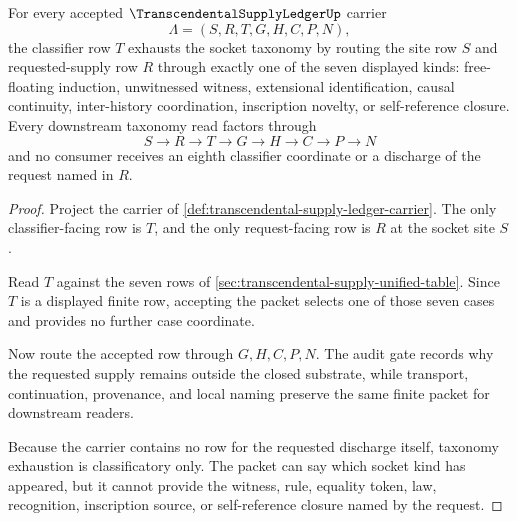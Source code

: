 \begin{theorem}
\label{thm:transcendental-supply-taxonomy-exhaustion}
For every accepted $\TranscendentalSupplyLedgerUp$ carrier
$$
\Lambda=(S,R,T,G,H,C,P,N),
$$
the classifier row $T$ exhausts the socket taxonomy by routing the site row $S$ and requested-supply row $R$ through exactly one of the seven displayed kinds: free-floating induction, unwitnessed witness, extensional identification, causal continuity, inter-history coordination, inscription novelty, or self-reference closure. Every downstream taxonomy read factors through
$$
S \to R \to T \to G \to H \to C \to P \to N
$$
and no consumer receives an eighth classifier coordinate or a discharge of the request named in $R$.
\end{theorem}
\begin{proof}
Project the carrier of \autoref{def:transcendental-supply-ledger-carrier}. The only classifier-facing row is $T$, and the only request-facing row is $R$ at the socket site $S$.

Read $T$ against the seven rows of \autoref{sec:transcendental-supply-unified-table}. Since $T$ is a displayed finite row, accepting the packet selects one of those seven cases and provides no further case coordinate.

Now route the accepted row through $G,H,C,P,N$. The audit gate records why the requested supply remains outside the closed substrate, while transport, continuation, provenance, and local naming preserve the same finite packet for downstream readers.

Because the carrier contains no row for the requested discharge itself, taxonomy exhaustion is classificatory only. The packet can say which socket kind has appeared, but it cannot provide the witness, rule, equality token, law, recognition, inscription source, or self-reference closure named by the request.
\end{proof}

